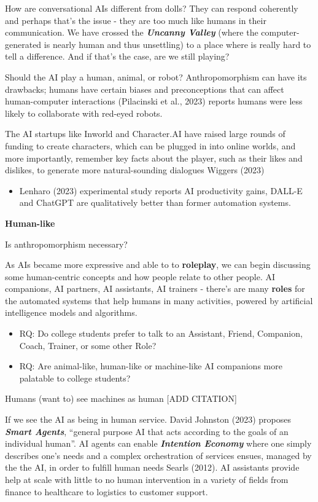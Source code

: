 \documentclass[
  letterpaper,
  DIV=11,
  numbers=noendperiod]{scrartcl}
\providecommand{\tightlist}{%
  \setlength{\itemsep}{0pt}\setlength{\parskip}{0pt}}\usepackage{longtable,booktabs,array}
\begin{document}
How are conversational AIs different from dolls? They can respond
coherently and perhaps that's the issue - they are too much like humans
in their communication. We have crossed the \textbf{\emph{Uncanny
Valley}} (where the computer-generated is nearly human and thus
unsettling) to a place where is really hard to tell a difference. And if
that's the case, are we still playing?

Should the AI play a human, animal, or robot? Anthropomorphism can have
its drawbacks; humans have certain biases and preconceptions that can
affect human-computer interactions (Pilacinski et al., 2023) reports
humans were less likely to collaborate with red-eyed robots.

The AI startups like Inworld and Character.AI have raised large rounds
of funding to create characters, which can be plugged in into online
worlds, and more importantly, remember key facts about the player, such
as their likes and dislikes, to generate more natural-sounding dialogues
Wiggers (2023)

\begin{itemize}
\tightlist
\item
  Lenharo (2023) experimental study reports AI productivity gains,
  DALL-E and ChatGPT are qualitatively better than former automation
  systems.
\end{itemize}

\textbf{Human-like}

Is anthropomorphism necessary?

As AIs became more expressive and able to to \textbf{roleplay}, we can
begin discussing some human-centric concepts and how people relate to
other people. AI companions, AI partners, AI assistants, AI trainers -
there's are many \textbf{roles} for the automated systems that help
humans in many activities, powered by artificial intelligence models and
algorithms.

\begin{itemize}
\item
  RQ: Do college students prefer to talk to an Assistant, Friend,
  Companion, Coach, Trainer, or some other Role?
\item
  RQ: Are animal-like, human-like or machine-like AI companions more
  palatable to college students?
\end{itemize}

Humans (want to) see machines as human {[}ADD CITATION{]}

If we see the AI as being in human service. David Johnston (2023)
proposes \textbf{\emph{Smart Agents}}, ``general purpose AI that acts
according to the goals of an individual human''. AI agents can enable
\textbf{\emph{Intention Economy}} where one simply describes one's needs
and a complex orchestration of services ensues, managed by the the AI,
in order to fulfill human needs Searls (2012). AI assistants provide
help at scale with little to no human intervention in a variety of
fields from finance to healthcare to logistics to customer support.
\end{document}
